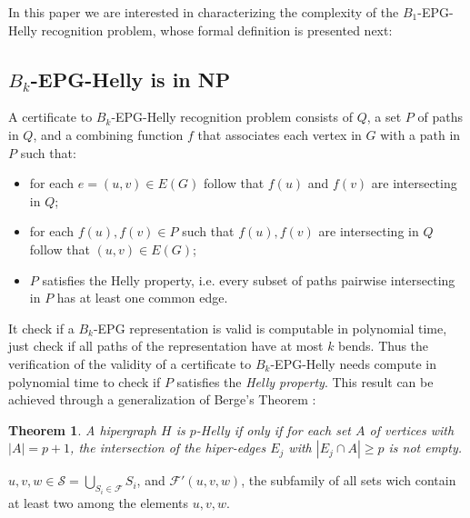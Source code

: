 \documentclass[a4paper,11pt]{article}
\newtheorem{theorem}{Theorem}
\begin{document}
In this paper we are interested in characterizing the complexity of the $B_1$-EPG-Helly recognition problem, whose formal definition is presented next:




\subsection{$B_k$-EPG-Helly is in NP}

A certificate to {\sc $B_k$-EPG-Helly recognition} problem consists of $Q$, a set $P$ of paths in $Q$, and a combining function $f$ that associates each vertex in $G$ with a path  in $P$ such that:

\begin{itemize}
\item for each $e=(u,v) \in E(G)$ follow that $f(u)$ and $f(v)$ are intersecting in $Q$;
\item for each $f(u),f(v) \in P$ such that $f(u),f(v)$ are intersecting in $Q$ follow that $(u,v) \in E(G)$;
\item $P$ satisfies the Helly property, i.e. every subset of paths pairwise intersecting in $P$ has at least one common edge.
\end{itemize}

It check if a $B_k$-EPG representation is valid is computable in polynomial time, just check if all paths of the representation have at most $k$ bends. Thus the verification of the validity of a certificate to $B_k$-EPG-Helly needs compute in polynomial time to check if $ P $ satisfies the  \textit{Helly property}. This result can be achieved through a generalization of Berge's Theorem \citep{bergeDuchet1975}:

\begin{theorem} \citep{bergeDuchet1975} A hipergraph $H$ is $p$-Helly  if only if for each set $A$ of vertices with $|A| = p+1$, the intersection of the hiper-edges $E_j$ with $|E_j \cap A|\geq p$ is not empty. 
\end{theorem}


$ \displaystyle  u,v,w \in \mathcal{S} = \bigcup _{S_i \in \mathcal{F}} S_i$, and $\mathcal{F'}(u,v,w)$, the subfamily of all sets wich contain at least two among the elements $u,v,w$. 
\end{document}
